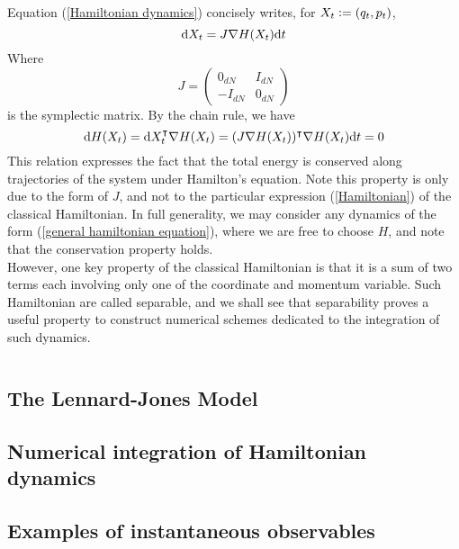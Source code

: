        \begin{remark}
        Equation (\ref{Hamiltonian dynamics}) concisely writes, for $X_t\mathrel{\mathop:}= (q_t,p_t)$, 
        \begin{equation}\label{general hamiltonian equation} \text d X_t=J\nabla H(X_t)\text dt\end{equation}
        Where
        $$J=\begin{pmatrix}
            0_{dN} & I_{dN}\\
            -I_{dN} & 0_{dN}
        \end{pmatrix}$$
        is the symplectic matrix. By the chain rule, we have
        $$ \text d H(X_t)=\text d X_t^{\intercal}\nabla H(X_t)=(J\nabla H(X_t))^\intercal \nabla H(X_t)\text dt=0$$
        This relation expresses the fact that the total energy is conserved along trajectories of the system under Hamilton's equation.
        Note this property is only due to the form of $J$, and not to the particular expression (\ref{Hamiltonian}) of the classical Hamiltonian.
        In full generality, we may consider any dynamics of the form (\ref{general hamiltonian equation}), where we are free to choose $H$, and note that the conservation property holds.\\
        However, one key property of the classical Hamiltonian is that it is a sum of two terms each involving only one of the coordinate and momentum variable. Such Hamiltonian are called separable, and we shall see that separability proves a useful property to construct numerical schemes dedicated to the integration of such dynamics.
        \end{remark}
        
        \begin{equation}
            \label{Hamiltonian generator}
        \end{equation}

        \label{non-separable hamiltonian}
        \label{evolution operator exponential notation}

    \subsection{The Lennard-Jones Model}

    \subsection{Numerical integration of Hamiltonian dynamics}

    \subsection{Examples of instantaneous observables}
        

